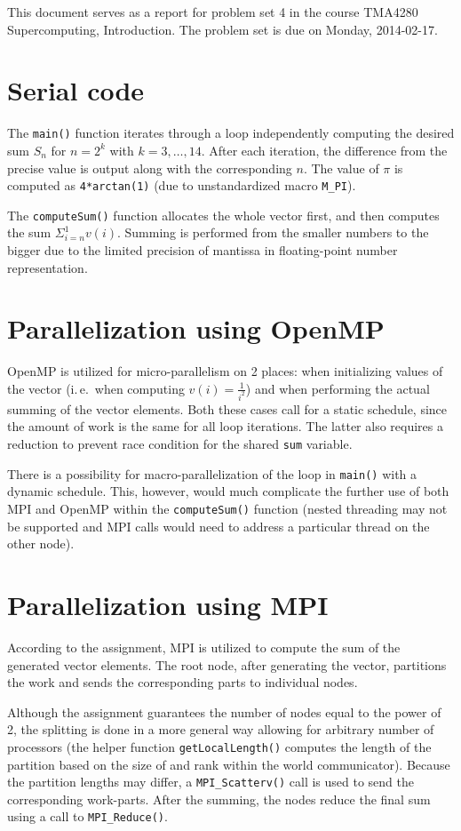 \documentclass[12pt]{simple-assignment} %
\begin{document}
\noindent
This document serves as a report for problem set 4 in the course TMA4280 Supercomputing, Introduction. The problem set is due on Monday, 2014-02-17.

\section{Serial code}
The \texttt{main()} function iterates through a loop independently computing the desired sum $S_n$ for $n = 2^k$ with $k = 3, \dots, 14$. After each iteration, the difference from the precise value is output along with the corresponding $n$. The value of $\pi$ is computed as \texttt{4*arctan(1)} (due to unstandardized macro \texttt{M\_PI}).

The \texttt{computeSum()} function allocates the whole vector first, and then computes the sum $\Sigma_{i=n}^{1}v(i)$. Summing is performed from the smaller numbers to the bigger due to the limited precision of mantissa in floating-point number representation.

\section{Parallelization using OpenMP}
OpenMP is utilized for micro-parallelism on 2 places: when initializing values of the vector (i.\,e.\ when computing $v(i)=\frac{1}{i^2}$) and when performing the actual summing of the vector elements. Both these cases call for a static schedule, since the amount of work is the same for all loop iterations. The latter also requires a reduction to prevent race condition for the shared \texttt{sum} variable.

There is a possibility for macro-parallelization of the loop in \texttt{main()} with a dynamic schedule. This, however, would much complicate the further use of both MPI and OpenMP within the \texttt{computeSum()} function (nested threading may not be supported and MPI calls would need to address a particular thread on the other node).

\section{Parallelization using MPI}
According to the assignment, MPI is utilized to compute the sum of the generated vector elements. The root node, after generating the vector, partitions the work and sends the corresponding parts to individual nodes. 

Although the assignment guarantees the number of nodes equal to the power of 2, the splitting is done in a more general way allowing for arbitrary number of processors (the helper function \texttt{getLocalLength()} computes the length of the partition based on the size of and rank within the world communicator). Because the partition lengths may differ, a \texttt{MPI\_Scatterv()} call is used to send the corresponding work-parts. After the summing, the nodes reduce the final sum using a call to \texttt{MPI\_Reduce()}.
\end{document}
